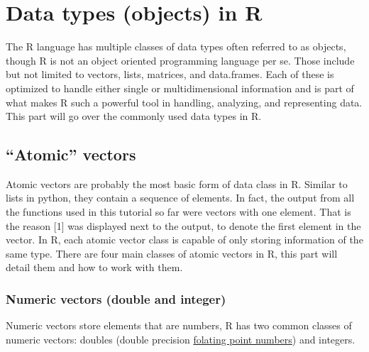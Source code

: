 \documentclass[
]{book}
\theoremstyle{definition}
\theoremstyle{definition}
\theoremstyle{definition}
\theoremstyle{definition}
\theoremstyle{remark}
\begin{document}
\hypertarget{data-types-objects-in-r}{%
\section*{\texorpdfstring{\textbf{Data types (objects) in R}}{Data types (objects) in R}}\label{data-types-objects-in-r}}

The R language has multiple classes of data types often referred to as objects, though R is not an object oriented
programming language per se. Those include but not limited to vectors, lists, matrices, and data.frames. Each of
these is optimized to handle either single or multidimensional information and is part of what makes R such a
powerful tool in handling, analyzing, and representing data. This part will go over the commonly used data types in
R.

\hypertarget{atomic-vectors}{%
\subsection*{\texorpdfstring{\textbf{``Atomic'' vectors}}{``Atomic'' vectors}}\label{atomic-vectors}}

Atomic vectors are probably the most basic form of data class in R. Similar to lists in python, they contain a
sequence of elements. In fact, the output from all the functions used in this tutorial so far were vectors with one
element. That is the reason {[}1{]} was displayed next to the output, to denote the first element in the vector. In R,
each atomic vector class is capable of only storing information of the same type. There are four main classes of
atomic vectors in R, this part will detail them and how to work with them.

\hypertarget{numeric-vectors-double-and-integer}{%
\subsubsection*{\texorpdfstring{\textbf{Numeric vectors (double and integer)}}{Numeric vectors (double and integer)}}\label{numeric-vectors-double-and-integer}}

Numeric vectors store elements that are numbers, R has two common classes of numeric vectors: doubles (double precision
\href{https://en.wikipedia.org/wiki/Floating-point_arithmetic}{folating point numbers}) and integers.
\end{document}
